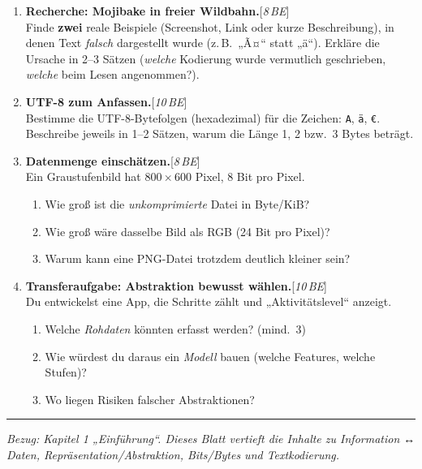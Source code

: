 \documentclass[11pt,a4paper]{scrartcl}
\newenvironment{aufgaben}{%
	\begin{enumerate}[leftmargin=*,label=\textbf{Aufgabe~\arabic*:}, itemsep=0.6em]
	}{\end{enumerate}}
\newcommand{\punkte}[1]{\hfill{\small[\textit{#1\,BE}]}}
\begin{document}
	\begin{aufgaben}
		
		\item \textbf{Recherche: Mojibake in freier Wildbahn.}\punkte{8}\\
		Finde \textbf{zwei} reale Beispiele (Screenshot, Link oder kurze Beschreibung), in denen Text \emph{falsch} dargestellt wurde (z.\,B.\ „Ã¤“ statt „ä“). Erkläre die Ursache in 2–3 Sätzen (\emph{welche} Kodierung wurde vermutlich geschrieben, \emph{welche} beim Lesen angenommen?).
		
		\item \textbf{UTF-8 zum Anfassen.}\punkte{10}\\
		Bestimme die UTF-8-Bytefolgen (hexadezimal) für die Zeichen: \texttt{A}, \texttt{ä}, \texttt{€}. Beschreibe jeweils in 1–2 Sätzen, warum die Länge 1, 2 bzw.\ 3 Bytes beträgt.
		
		\item \textbf{Datenmenge einschätzen.}\punkte{8}\\
		Ein Graustufenbild hat 800\,$\times$\,600 Pixel, 8 Bit pro Pixel.\\
		\begin{enumerate}[label*=\alph*)]
			\item Wie groß ist die \emph{unkomprimierte} Datei in Byte/KiB?\\
			\item Wie groß wäre dasselbe Bild als RGB (24 Bit pro Pixel)?\\
			\item Warum kann eine PNG-Datei trotzdem deutlich kleiner sein?
		\end{enumerate}
		
		\item \textbf{Transferaufgabe: Abstraktion bewusst wählen.}\punkte{10}\\
		Du entwickelst eine App, die Schritte zählt und „Aktivitätslevel“ anzeigt.\\
		\begin{enumerate}[label*=\alph*)]
			\item Welche \emph{Rohdaten} könnten erfasst werden? (mind.\ 3)\\
			\item Wie würdest du daraus ein \emph{Modell} bauen (welche Features, welche Stufen)?\\
			\item Wo liegen Risiken falscher Abstraktionen?
		\end{enumerate}
		
	\end{aufgaben}
	
	\vfill
	\hrule
	\small\emph{Bezug: Kapitel 1 „Einführung“. Dieses Blatt vertieft die Inhalte zu Information ↔ Daten, Repräsentation/Abstraktion, Bits/Bytes und Textkodierung.}
	
\end{document}
